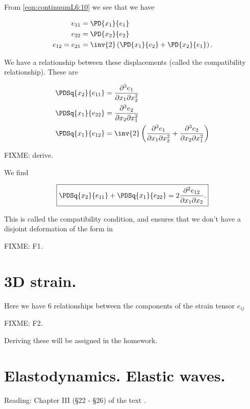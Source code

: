 From \ref{eqn:continuumL6:10} we see that we have

\begin{align}\label{eqn:continuumL6:70}
e_{11} &= \PD{x_1}{e_1} \\
e_{22} &= \PD{x_2}{e_2} \\
e_{12} = e_{21} &= 
\inv{2} \left( 
\PD{x_1}{e_2}
+ \PD{x_2}{e_1} \right).
\end{align}

We have a relationship between these displacements (called the compatibility relationship).  These are 

\begin{align}\label{eqn:continuumL6:90}
\PDSq{x_2}{e_{11}} &= \frac{\partial^3 e_1}{\partial x_1 \partial x_2^2} \\
\PDSq{x_1}{e_{22}} &= \frac{\partial^3 e_2}{\partial x_2 \partial x_1^2} \\
\PDSq{x_1}{e_{12}} &= 
\inv{2} \left(
\frac{\partial^3 e_1}{\partial x_1 \partial x_2^2} 
+
\frac{\partial^3 e_2}{\partial x_2 \partial x_1^2} 
\right)
\end{align}

FIXME: derive.

We find

\begin{equation}\label{eqn:continuumL6:110}
\boxed{
\PDSq{x_2}{e_{11}} +
\PDSq{x_1}{e_{22}} = 
2
\frac{\partial^2 e_{12}}{\partial x_1 \partial x_2}.
}
\end{equation}

This is called the compatibility condition, and ensures that we don't have a disjoint deformation of the form in 

FIXME: F1.

\section{3D strain.}

Here we have 6 relationships between the components of the strain tensor $e_{ij}$

FIXME: F2.

Deriving these will be assigned in the homework.

\section{Elastodynamics.  Elastic waves.}

Reading: Chapter III (\S 22 - \S 26) of the text \cite{landau1960theory}.

